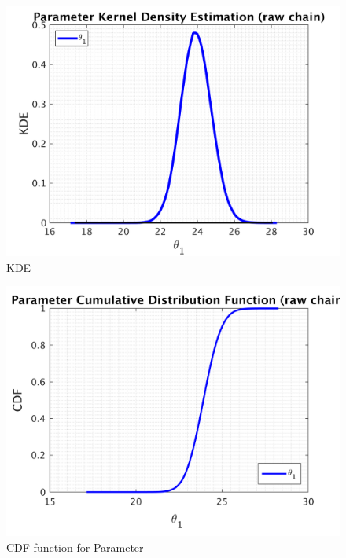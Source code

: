 %
%
%
\begin{figure}[H]
  
  \centering
   \includegraphics[scale=0.75]{100_results/outputData_100/simple_ip_kde_raw}
   \caption{ KDE }
\end{figure}
%
\clearpage

\begin{figure}[H]
  
  \centering
   \includegraphics[scale=0.75]{100_results/outputData_100/simple_ip_cdf_raw}
   \caption{CDF function for Parameter }
\end{figure}

\clearpage

